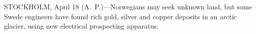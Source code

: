 
STOCKHOLM, April 18 (A.~P.)---Norwegians may seek unknown land, but
some Swede engineers have found rich gold, silver and copper deposits
in an arctic glacier, using new electrical prospecting apparatus.
